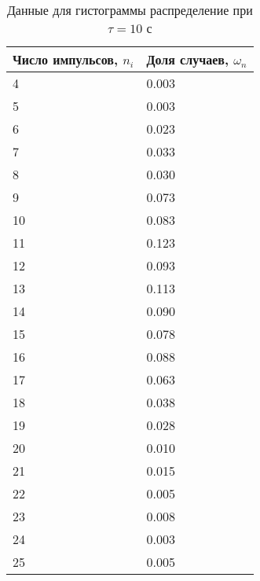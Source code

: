 \documentclass[a4paper]{article}
\begin{document}
\begin{table}[!h]
\begin{center}
\begin{tabular}{|l|l|}
\hline
Число импульсов, $n_{i}$ & Доля случаев, $\omega_{n}$ \\ \hline
4                        & 0.003                     \\ \hline
5                        & 0.003                     \\ \hline
6                        & 0.023                     \\ \hline
7                        & 0.033                     \\ \hline
8                        & 0.030                      \\ \hline
9                        & 0.073                     \\ \hline
10                       & 0.083                     \\ \hline
11                       & 0.123                      \\ \hline
12                       & 0.093                      \\ \hline
13                       & 0.113                       \\ \hline
14                       & 0.090                    \\ \hline
15                       & 0.078                     \\ \hline
16                       & 0.088                     \\ \hline
17                       & 0.063                       \\ \hline
18                       & 0.038                     \\ \hline
19                       & 0.028                     \\ \hline
20                       & 0.010                       \\ \hline
21                       & 0.015                      \\ \hline
22                       & 0.005                      \\ \hline
23                       & 0.008                      \\ \hline
24                       & 0.003                      \\ \hline
25                       & 0.005                     \\ \hline
\end{tabular}
\caption{Данные для гистограммы распределение при $\tau = 10$ с}
\end{center}
\end{table}
\end{document}
